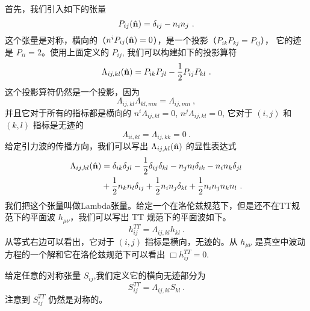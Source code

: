首先，我们引入如下的张量
\begin{equation}
P_{ij} (\hat{\bf{n}} ) = \delta_{ij} - n_in_j~.
\end{equation}
这个张量是对称，横向的（$ n^iP_{ij}(\hat{\bf{n}}) = 0 $），是一个投影（$ P_{ik} P_{kj} = P_{ij}$）， 它的迹是 $P_{ii} = 2$。使用上面定义的 $P_{ij}$, 我们可以构建如下的投影算符
\begin{equation}
\Lambda_{ij,kl} ( \hat{\bf{n}} )  = P_{ik} P_{jl} - \frac{1}{2} P_{ij} P_{kl} ~. 
\end{equation}
这个投影算符仍然是一个投影，因为
\begin{equation}
\Lambda_{ij,kl} \Lambda_{kl,mn} = \Lambda_{ij,mn} ~, 
\end{equation}
并且它对于所有的指标都是横向的 $ n^i \Lambda_{ij,kl} = 0 $, $ n^j \Lambda_{ij,kl} = 0 $, 它对于 $(i,j)$ 和 $(k,l)$ 指标是无迹的
\begin{equation}
\Lambda_{ii,kl} = \Lambda_{ij,kk} = 0 ~. 
\end{equation}
给定引力波的传播方向，我们可以写出 $\Lambda_{ij,kl} (\hat{ {\bf n} })$ 的显性表达式
\begin{equation}
\begin{aligned}
\Lambda_{ij,kl} (\hat{ {\bf n} }   ) & = \delta_{ik} \delta_{jl} - \frac{1}{2} \delta_{ij} \delta_{kl} - n_j n_l \delta_{ik} - n_i n_k \delta_{jl} \\
& + \frac{1}{2} n_k n_l \delta_{ij} + \frac{1}{2} n_i n_j \delta_{kl} + \frac{1}{2} n_i n_j n_k n_l ~.
\end{aligned}
\end{equation}
我们把这个张量叫做Lambda张量。给定一个在洛伦兹规范下，但是还不在TT规范下的平面波 $h_{\mu\nu}$，我们可以写出 TT 规范下的平面波如下。
\begin{equation}
h_{ij}^{TT} = \Lambda_{ij,kl} h_{kl} ~.
\end{equation}
从等式右边可以看出，它对于 $(i,j)$ 指标是横向，无迹的。从 $h_{\mu\nu}$ 是真空中波动方程的一个解和它在洛伦兹规范下可以看出 $\Box h_{ij}^{TT} = 0$. 

给定任意的对称张量 $S_{ij}$,我们定义它的横向无迹部分为
\begin{equation}
S^{TT}_{ij} = \Lambda_{ij,kl} S_{kl} ~.
\end{equation}
注意到 $S^{TT}_{ij}$ 仍然是对称的。

